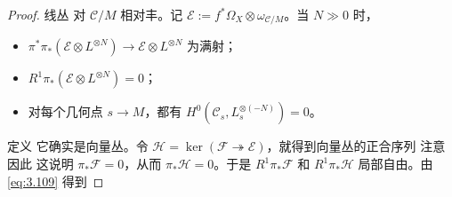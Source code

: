 \begin{proof}
线丛
对 $\mathcal C/M$ 相对丰。记 $\mathcal E:=f^*\Omega_X\otimes\omega_{\mathcal C/M}$。当 $N\gg0$ 时，
\begin{itemize}
\item $\pi^*\pi_*(\mathcal E\otimes L^{\otimes N})\to\mathcal E\otimes L^{\otimes N}$ 为满射；
\item $R^1\pi_*(\mathcal E\otimes L^{\otimes N})=0$；
\item 对每个几何点 $s\to M$，都有 $H^0(\mathcal C_s,L_s^{\otimes(-N)})=0$。
\end{itemize}
定义
它确实是向量丛。令 $\mathcal H=\ker(\mathcal F\twoheadrightarrow\mathcal E)$，就得到向量丛的正合序列
注意
因此
这说明 $\pi_*\mathcal F=0$，从而 $\pi_*\mathcal H=0$。于是 $R^1\pi_*\mathcal F$ 和 $R^1\pi_*\mathcal H$ 局部自由。由 \eqref{eq:3.109} 得到

\end{proof}
